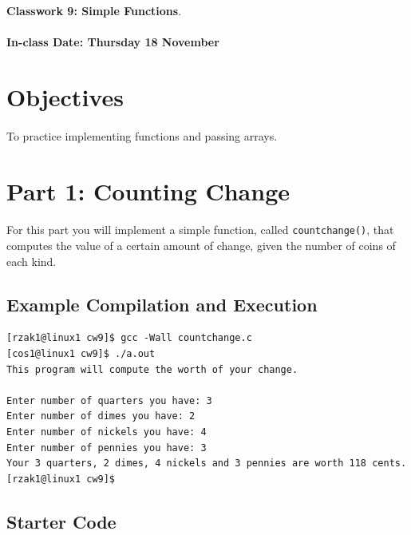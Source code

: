 \documentclass[letter,11pt]{article}
\begin{document}
\huge
\textbf{Classwork 9: Simple Functions}.
\normalsize
\\ ~~ \\
\textbf{In-class Date: Thursday 18 November}

\section*{Objectives}
\paragraph{}To practice implementing functions and passing arrays.

\section*{Part 1: Counting Change}
\paragraph{}For this part you will implement a simple function, called \texttt{countchange()}, that computes the value of a certain amount of change, given the number of coins of each kind.

\subsection*{Example Compilation and Execution}
\begin{verbatim}
[rzak1@linux1 cw9]$ gcc -Wall countchange.c
[cos1@linux1 cw9]$ ./a.out
This program will compute the worth of your change.

Enter number of quarters you have: 3
Enter number of dimes you have: 2
Enter number of nickels you have: 4
Enter number of pennies you have: 3
Your 3 quarters, 2 dimes, 4 nickels and 3 pennies are worth 118 cents.
[rzak1@linux1 cw9]$ 
\end{verbatim}

\subsection*{Starter Code}
\end{document}
